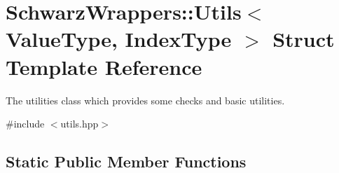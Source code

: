 \hypertarget{structSchwarzWrappers_1_1Utils}{}\section{Schwarz\+Wrappers\+:\+:Utils$<$ Value\+Type, Index\+Type $>$ Struct Template Reference}
\label{structSchwarzWrappers_1_1Utils}


The utilities class which provides some checks and basic utilities.  




{\ttfamily \#include $<$utils.\+hpp$>$}

\subsection*{Static Public Member Functions}
